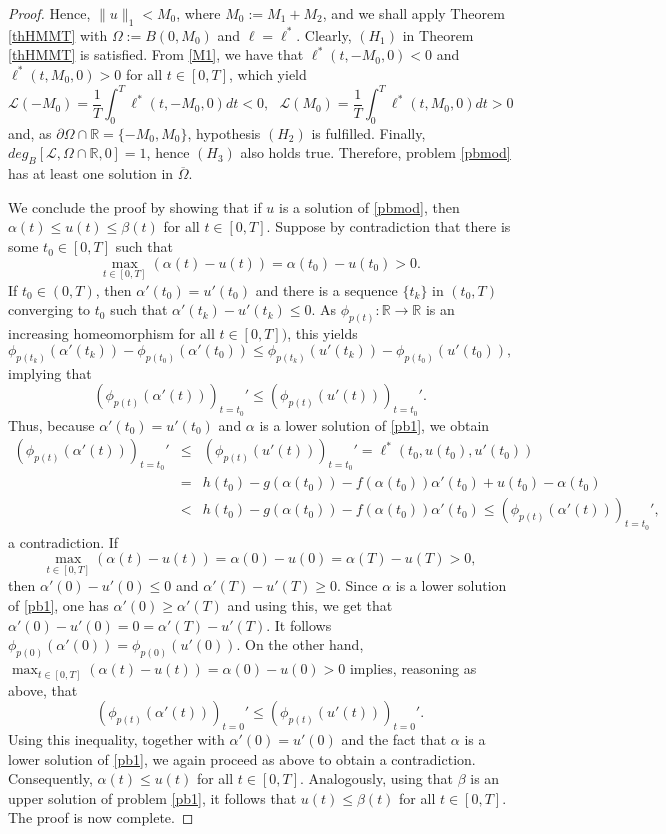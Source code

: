 \documentclass[11pt]{amsart}
\numberwithin{equation}{section} \textwidth=15.5cm
\begin{document}
\begin{proof}
Hence, $\|u\|_1<M_0$, where $M_0:=M_1+M_2$, and we shall apply Theorem \ref{thHMMT} with $\Omega:=B(0,M_0)$ and $\ell=\ell^*$.
Clearly,  $(H_1)$ in Theorem \ref{thHMMT} is satisfied.
From \eqref{M1}, we have that $\ell^*(t,-M_0,0)<0$ and $\ell^*(t,M_0,0)>0$ for all $t\in [0,T]$, which yield
$$\mathcal{L}(-M_0)=\frac{1}{T}\int_0^T\ell^*(t,-M_0,0)dt<0,\ \ \ \mathcal{L}(M_0)=\frac{1}{T}\int_0^T\ell^*(t,M_0,0)dt>0$$
and, as $\partial \Omega \cap \mathbb{R}=\{ -M_0, M_0 \}$, hypothesis $(H_2)$  is fulfilled. Finally,  $deg_B[\mathcal{L},\Omega\cap\mathbb{R},0]=1$, hence $(H_3)$ also holds true. Therefore, problem \eqref{pbmod} has at least one solution in $\overline{\Omega}$.

We conclude the proof by showing that if $u$ is a solution of \eqref{pbmod}, then $\alpha(t)\leq u(t)\leq\beta(t)$ for all $t\in[0,T]$. Suppose by contradiction that there is some $t_0\in[0,T]$ such that $$\max_{t\in[0,T]}(\alpha(t)-u(t))=\alpha(t_0)-u(t_0)>0.$$
If $t_0\in(0,T)$, then $\alpha'(t_0)=u'(t_0)$ and there is a sequence $\{t_k\}$ in $(t_0, T)$ converging to $t_0$ such that $\alpha'(t_k)-u'(t_k)\leq0$. As $\phi_{p(t)}: \mathbb{R} \to \mathbb{R}$
is an increasing homeomorphism for all $t\in [0,T])$, this yields
$$\phi_{p(t_k)}(\alpha'(t_k))-\phi_{p(t_0)}(\alpha'(t_0))\leq\phi_{p(t_k)}(u'(t_k))-\phi_{p(t_0)}(u'(t_0)),$$
implying that
$$\left(\phi_{p(t)}(\alpha'(t))\right)_{t=t_0}'\leq\left(\phi_{p(t)}(u'(t))\right)_{t=t_0}'.$$
Thus, because $\alpha'(t_0)=u'(t_0)$ and $\alpha$ is a lower solution of \eqref{pb1}, we obtain
\begin{eqnarray*}
  \left(\phi_{p(t)}(\alpha'(t))\right)_{t=t_0}' &\leq& \left(\phi_{p(t)}(u'(t))\right)_{t=t_0}'=\ell^*(t_0,u(t_0),u'(t_0)) \\
  &=& h(t_0)-g(\alpha(t_0))-f(\alpha(t_0))\alpha'(t_0)+u(t_0)-\alpha(t_0)\\
  &<& h(t_0)-g(\alpha(t_0))-f(\alpha(t_0))\alpha'(t_0)\leq \left(\phi_{p(t)}(\alpha'(t))\right)_{t=t_0}',
\end{eqnarray*}
a contradiction. If $$\max_{t\in[0,T]}(\alpha(t)-u(t))=\alpha(0)-u(0)=\alpha(T)-u(T)>0,$$
then $\alpha'(0)-u'(0)\leq0$ and $\alpha'(T)-u'(T)\geq0$. Since $\alpha$ is a lower solution of \eqref{pb1}, one has $\alpha'(0)\geq\alpha'(T)$ and using this, we get that $\alpha'(0)-u'(0)=0=\alpha'(T)-u'(T)$. It follows  $\phi_{p(0)}(\alpha'(0))=\phi_{p(0)}(u'(0))$. On the other hand, $\max_{t\in[0,T]}(\alpha(t)-u(t))=\alpha(0)-u(0)>0$ implies, reasoning as above, that
$$\left(\phi_{p(t)}(\alpha'(t))\right)_{t=0}'\leq\left(\phi_{p(t)}(u'(t))\right)_{t=0}'.$$
Using this inequality, together with $\alpha'(0)=u'(0)$ and the fact that $\alpha$ is a lower solution of \eqref{pb1}, we again proceed as above to obtain a contradiction. Consequently, $\alpha(t)\leq u(t)$ for all $t\in[0,T]$. Analogously, using that $\beta$ is an upper solution of problem \eqref{pb1}, it follows that $u(t)\leq\beta(t)$ for all $t\in[0,T]$. The proof is now complete.
\end{proof}
\smallskip
\end{document}
